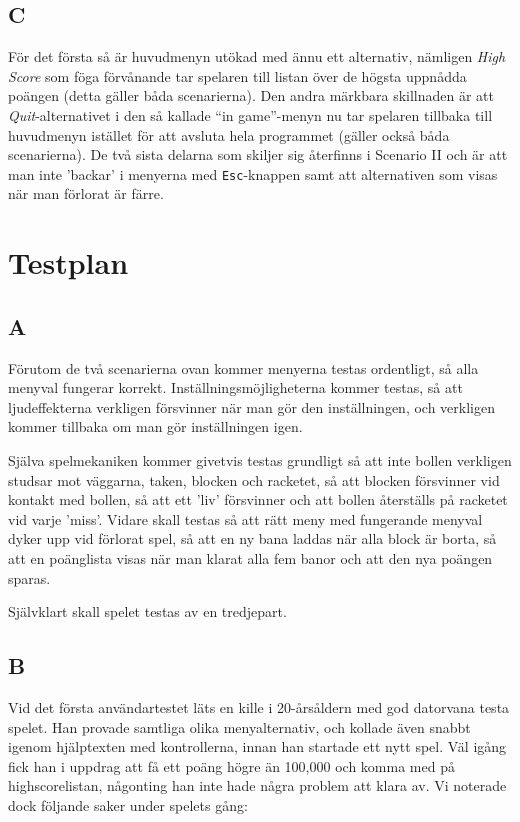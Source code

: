 \documentclass[11pt,a4paper]{article}
\begin{document}
\subsection{C}
För det första så är huvudmenyn utökad med ännu ett alternativ, nämligen \emph{High Score} som föga förvånande tar spelaren till listan över de högsta uppnådda poängen (detta gäller båda scenarierna). Den andra märkbara skillnaden är att \emph{Quit}-alternativet i den så kallade ``in game''-menyn nu tar spelaren tillbaka till huvudmenyn istället för att avsluta hela programmet (gäller också båda scenarierna). De två sista delarna som skiljer sig återfinns i Scenario II och är att man inte 'backar' i menyerna med \texttt{Esc}-knappen samt att alternativen som visas när man förlorat är färre.

\section{Testplan}

\subsection{A}
Förutom de två scenarierna ovan kommer menyerna testas ordentligt, så alla menyval fungerar korrekt. Inställningsmöjligheterna kommer testas, så att ljudeffekterna verkligen försvinner när man gör den inställningen, och verkligen kommer tillbaka om man gör inställningen igen.

Själva spelmekaniken kommer givetvis testas grundligt så att inte bollen verkligen studsar mot väggarna, taken, blocken och racketet, så att blocken försvinner vid kontakt med bollen, så att ett 'liv' försvinner och att bollen återställs på racketet vid varje 'miss'. Vidare skall testas så att rätt meny med fungerande menyval dyker upp vid förlorat spel, så att en ny bana laddas när alla block är borta, så att en poänglista visas när man klarat alla fem banor och att den nya poängen sparas.

Självklart skall spelet testas av en tredjepart.

\subsection{B}
Vid det första användartestet läts en kille i 20-årsåldern med god datorvana testa spelet. Han provade samtliga olika menyalternativ, och kollade även snabbt igenom hjälptexten med kontrollerna, innan han startade ett nytt spel. Väl igång fick han i uppdrag att få ett poäng högre än 100,000 och komma med på highscorelistan, någonting han inte hade några problem att klara av.
Vi noterade dock följande saker under spelets gång:
\end{document}
